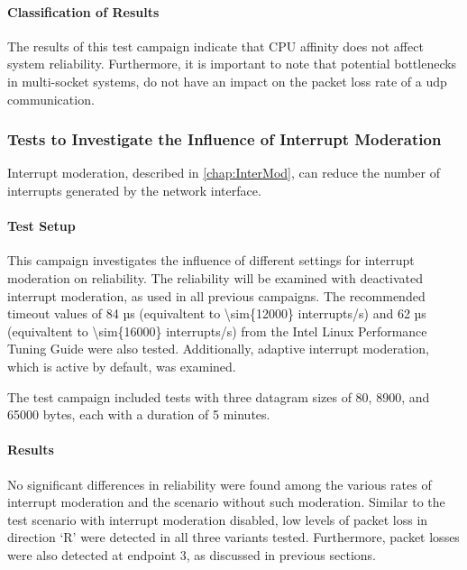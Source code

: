 \paragraph{Classification of Results}
The results of this test campaign indicate that \ac{CPU} affinity does not affect system reliability. Furthermore, it is important to note that potential bottlenecks in multi-socket systems, do not have an impact on the packet loss rate of a \ac{udp} communication.


\subsubsection{Tests to Investigate the Influence of Interrupt Moderation} \label{chap:RelInterMod}
Interrupt moderation, described in \ref{chap:InterMod}, can reduce the number of interrupts generated by the network interface.

\paragraph{Test Setup}
This campaign investigates the influence of different settings for interrupt moderation on reliability. The reliability will be examined with deactivated interrupt moderation, as used in all previous campaigns. The recommended timeout values of 84 µs (equivaltent to \num{\sim{12000}} interrupts/s) and 62 µs (equivaltent to \num{\sim{16000}} interrupts/s) from the Intel Linux Performance Tuning Guide \cite{intermod03} were also tested. Additionally, adaptive interrupt moderation, which is active by default, was examined.  

The test campaign included tests with three datagram sizes of 80, 8900, and 65000 bytes, each with a duration of 5 minutes.

\paragraph{Results}
No significant differences in reliability were found among the various rates of interrupt moderation and the scenario without such moderation. Similar to the test scenario with interrupt moderation disabled, low levels of packet loss in direction `R' were detected in all three variants tested. Furthermore, packet losses were also detected at endpoint 3, as discussed in previous sections.

